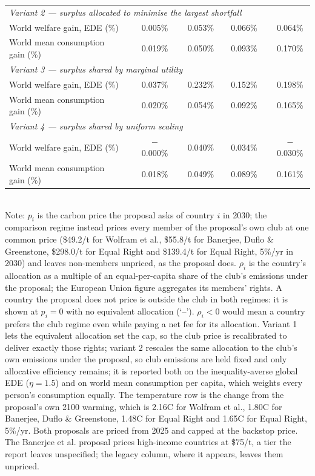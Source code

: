 \begin{table}[htbp]
\begin{tabular}{lcccccccc}
  \midrule
  \multicolumn{9}{l}{\textit{Variant 2 --- surplus allocated to minimise the largest shortfall}} \\
  \quad World welfare gain, EDE (\%) &  & 0.005\% &  & 0.053\% &  & 0.066\% &  & 0.064\% \\
  \quad World mean consumption gain (\%) &  & 0.019\% &  & 0.050\% &  & 0.093\% &  & 0.170\% \\
  \midrule
  \multicolumn{9}{l}{\textit{Variant 3 --- surplus shared by marginal utility}} \\
  \quad World welfare gain, EDE (\%) &  & 0.037\% &  & 0.232\% &  & 0.152\% &  & 0.198\% \\
  \quad World mean consumption gain (\%) &  & 0.020\% &  & 0.054\% &  & 0.092\% &  & 0.165\% \\
  \midrule
  \multicolumn{9}{l}{\textit{Variant 4 --- surplus shared by uniform scaling}} \\
  \quad World welfare gain, EDE (\%) &  & $-$0.000\% &  & 0.040\% &  & 0.034\% &  & $-$0.030\% \\
  \quad World mean consumption gain (\%) &  & 0.018\% &  & 0.049\% &  & 0.089\% &  & 0.161\% \\
  \bottomrule
\end{tabular}
\label{tab:equiv_rights_B}
\\[4pt]
{\footnotesize Note: $p_i$ is the carbon price the proposal asks of country $i$ in 2030; the comparison regime instead prices every member of the proposal's own club at one common price (\$49.2/t for Wolfram et al., \$55.8/t for Banerjee, Duflo \& Greenstone, \$298.0/t for Equal Right and \$139.4/t for Equal Right, 5\%/yr in 2030) and leaves non-members unpriced, as the proposal does. $\rho_i$ is the country's allocation as a multiple of an equal-per-capita share of the club's emissions under the proposal; the European Union figure aggregates its members' rights. A country the proposal does not price is outside the club in both regimes: it is shown at $p_i=0$ with no equivalent allocation (`--'). $\rho_i < 0$ would mean a country prefers the club regime even while paying a net fee for its allocation. Variant 1 lets the equivalent allocation set the cap, so the club price is recalibrated to deliver exactly those rights; variant 2 rescales the same allocation to the club's own emissions under the proposal, so club emissions are held fixed and only allocative efficiency remains; it is reported both on the inequality-averse global EDE ($\eta=1.5$) and on world mean consumption per capita, which weights every person's consumption equally. The temperature row is the change from the proposal's own 2100 warming, which is 2.16\textdegree{}C for Wolfram et al., 1.80\textdegree{}C for Banerjee, Duflo \& Greenstone, 1.48\textdegree{}C for Equal Right and 1.65\textdegree{}C for Equal Right, 5\%/yr. Both proposals are priced from 2025 and capped at the backstop price. The Banerjee et al. proposal prices high-income countries at \$75/t, a tier the report leaves unspecified; the legacy column, where it appears, leaves them unpriced.}
\end{table}
